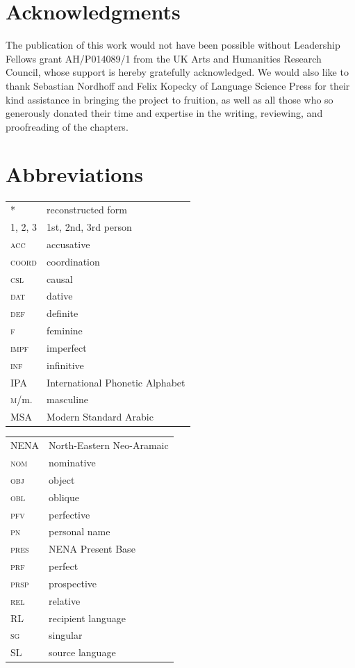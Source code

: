 \documentclass[output=paper]{langsci/langscibook}
\begin{document}
\section*{Acknowledgments}
The publication of this work would not have been possible without Leadership Fellows grant AH/P014089/1 from the UK Arts and Humanities Research Council, whose support is hereby gratefully acknowledged. We would also like to thank Sebastian Nordhoff and Felix Kopecky of Language Science Press for their kind assistance in bringing the project to fruition, as well as all those who so generously donated their time and expertise in the writing, reviewing, and proofreading of the chapters.


\section*{Abbreviations}

\begin{tabularx}{.5\textwidth}[t]{@{}lQ@{}}
*  &  reconstructed form\\
\textsc{1, 2, 3} & 1st, 2nd, 3rd person \\
\textsc{acc} & accusative\\
\textsc{coord} & {coordination}\\
\textsc{csl} & causal \\
\textsc{dat} & dative\\
\textsc{def} & {definite}\\
\textsc{f} & feminine\\
\textsc{impf} & imperfect\\
\textsc{inf} & {infinitive}\\
IPA & International Phonetic Alphabet\\
\textsc{m}/m. & masculine\\
MSA & Modern Standard Arabic
\end{tabularx}%
\begin{tabularx}{.5\textwidth}[t]{@{}lQ@{}}
NENA & North-Eastern Neo-Aramaic\\
\textsc{nom} & nominative\\
\textsc{obj} & object \\
\textsc{obl} & oblique \\
\textsc{pfv} & perfective\\
\textsc{pn} & personal name \\
\textsc{pres}    & NENA Present Base \\
\textsc{prf} & perfect\\
\textsc{prsp} & {prospective}\\
\textsc{rel} & {relative}\\
{RL} & {recipient language}\\
\textsc{sg} & singular\\
{SL} & {source language}\\
\end{tabularx}%

\sloppy
\printbibliography[heading=subbibliography,notkeyword=this]
\end{document}
